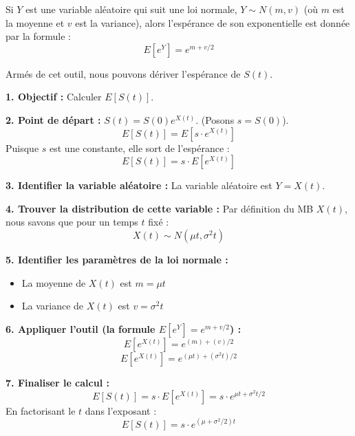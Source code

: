\begin{remarquebox}
Si $Y$ est une variable aléatoire qui suit une loi normale, $Y \sim N(m, v)$ (où $m$ est la moyenne et $v$ est la variance), alors l'espérance de son exponentielle est donnée par la formule :
$$ E[e^Y] = e^{m + v/2} $$
\end{remarquebox}

Armés de cet outil, nous pouvons dériver l'espérance de $S(t)$.

\begin{examplebox}
\textbf{1. Objectif :} Calculer $E[S(t)]$.

\textbf{2. Point de départ :} $S(t) = S(0) e^{X(t)}$. (Posons $s = S(0)$).
$$ E[S(t)] = E[s \cdot e^{X(t)}] $$
Puisque $s$ est une constante, elle sort de l'espérance :
$$ E[S(t)] = s \cdot E[e^{X(t)}] $$

\textbf{3. Identifier la variable aléatoire :} La variable aléatoire est $Y = X(t)$.

\textbf{4. Trouver la distribution de cette variable :} Par définition du MB $X(t)$, nous savons que pour un temps $t$ fixé :
$$ X(t) \sim N(\mu t, \sigma^2 t) $$

\textbf{5. Identifier les paramètres de la loi normale :}
\begin{itemize}
    \item La moyenne de $X(t)$ est $m = \mu t$
    \item La variance de $X(t)$ est $v = \sigma^2 t$
\end{itemize}

\textbf{6. Appliquer l'outil (la formule $E[e^Y] = e^{m + v/2}$) :}
$$ E[e^{X(t)}] = e^{\left( m \right) + \left( v \right)/2} $$
$$ E[e^{X(t)}] = e^{\left( \mu t \right) + \left( \sigma^2 t \right)/2} $$

\textbf{7. Finaliser le calcul :}
$$ E[S(t)] = s \cdot E[e^{X(t)}] = s \cdot e^{\mu t + \sigma^2 t / 2} $$
En factorisant le $t$ dans l'exposant :
$$ E[S(t)] = s \cdot e^{(\mu + \sigma^2/2)t} $$
\end{examplebox}

